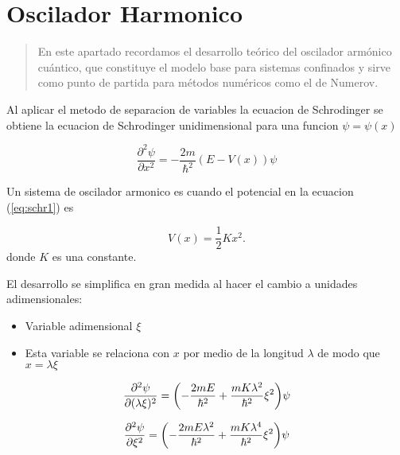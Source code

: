 \documentclass[11pt]{article}
\author{Rafael Corella, Carlos Felix, Bryan Campa}
\date{\today}
\begin{document}
\section{Oscilador Harmonico}

\begin{abstract}
En este apartado recordamos el desarrollo teórico del oscilador armónico
cuántico, que constituye el modelo base para sistemas confinados y sirve
como punto de partida para métodos numéricos como el de Numerov.
\end{abstract}

Al aplicar el metodo de separacion de variables la ecuacion de Schrodinger se obtiene la ecuacion de Schrodinger unidimensional para una funcion \(\psi = \psi(x)\)

\begin{equation}
\label{eq:schr1}
\frac{\partial^{2}\psi}{\partial x^2} = - \frac{2m}{\hbar^2}(E - V(x))\psi
\end{equation}

Un sistema de oscilador armonico es cuando el potencial en la ecuacion (\ref{eq:schr1}) es

\[ V(x) = \frac{1}{2}K x^2. \]
donde \(K\) es una constante.

El desarrollo se simplifica en gran medida al hacer el cambio a unidades adimensionales:

\begin{itemize}
\item Variable adimensional \(\xi\)
\item Esta variable se relaciona con \(x\) por medio de la longitud \(\lambda\) de modo que \(x = \lambda \xi\)
\end{itemize}

\[ \pdv[2]{\psi}{(\lambda \xi)} = \qty( - \frac{2m E }{\hbar^2} + \frac{mK \lambda^2}{\hbar^2} \xi^2  )\psi \]

\[ \pdv[2]{\psi}{\xi} = \qty( - \frac{2m E \lambda^{2}}{\hbar^2} + \frac{mK \lambda^4}{\hbar^2} \xi^2  )\psi \]
\end{document}
